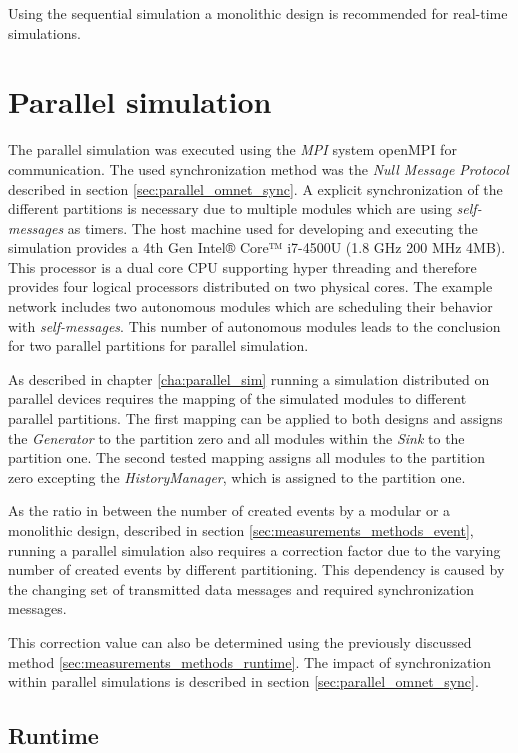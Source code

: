 Using the sequential simulation a monolithic design is recommended for real-time simulations.


\section{Parallel simulation}
\label{sec:measurements_parallel}
The parallel simulation was executed using the \emph{MPI} system openMPI for communication.
The used synchronization method was the \emph{Null Message Protocol} described in section \ref{sec:parallel_omnet_sync}.
A explicit synchronization of the different partitions is necessary due to multiple modules which are using \emph{self-messages} as timers.
The host machine used for developing and executing the simulation provides a 4th Gen Intel® Core™ i7-4500U (1.8 GHz 200 MHz 4MB).
This processor is a dual core CPU supporting hyper threading and therefore provides four logical processors distributed on two physical cores.
The example network includes two autonomous modules which are scheduling their behavior with \emph{self-messages}.
This number of autonomous modules leads to the conclusion for two parallel partitions for parallel simulation.

As described in chapter \ref{cha:parallel_sim} running a simulation distributed on parallel devices requires the mapping of the simulated modules to different parallel partitions.
The first mapping can be applied to both designs and assigns the \emph{Generator} to the partition zero and all modules within the \emph{Sink} to the partition one.
The second tested mapping assigns all modules to the partition zero excepting the \emph{HistoryManager}, which is assigned to the partition one.

As the ratio in between the number of created events by a modular or a monolithic design, described in section \ref{sec:measurements_methods_event}, running a parallel simulation also requires a correction factor due to the varying number of created events by different partitioning.
This dependency is caused by the changing set of transmitted data messages and required synchronization messages.

This correction value can also be determined using the previously discussed method \ref{sec:measurements_methods_runtime}.
The impact of synchronization within parallel simulations is described in section \ref{sec:parallel_omnet_sync}.

\subsection{Runtime}
\label{sec:measurements_parallel_runtime}


